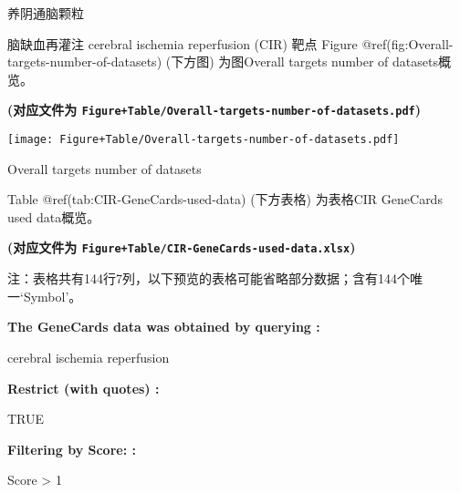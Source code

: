 \documentclass[
  ignorenonframetext,
]{beamer}
\begin{document}
\begin{frame}[fragile]{养阴通脑颗粒}
\begin{block}{脑缺血再灌注 cerebral ischemia reperfusion (CIR) 靶点}
Figure @ref(fig:Overall-targets-number-of-datasets) (下方图) 为图Overall
targets number of datasets概览。

\textbf{(对应文件为
\texttt{Figure+Table/Overall-targets-number-of-datasets.pdf})}

\def\@captype{figure}
\begin{center}
\texttt{[image: Figure+Table/Overall-targets-number-of-datasets.pdf]}
\caption{Overall targets number of datasets}\label{fig:Overall-targets-number-of-datasets}
\end{center}

Table @ref(tab:CIR-GeneCards-used-data) (下方表格) 为表格CIR GeneCards
used data概览。

\textbf{(对应文件为 \texttt{Figure+Table/CIR-GeneCards-used-data.xlsx})}

\begin{center}\begin{tcolorbox}[colback=gray!10, colframe=gray!50, width=0.9\linewidth, arc=1mm, boxrule=0.5pt]注：表格共有144行7列，以下预览的表格可能省略部分数据；含有144个唯一`Symbol'。
\end{tcolorbox}
\end{center}\begin{center}\begin{tcolorbox}[colback=gray!10, colframe=gray!50, width=0.9\linewidth, arc=1mm, boxrule=0.5pt]
\textbf{
The GeneCards data was obtained by querying
:}

\vspace{0.5em}

    cerebral ischemia reperfusion

\vspace{2em}


\textbf{
Restrict (with quotes)
:}

\vspace{0.5em}

    TRUE

\vspace{2em}


\textbf{
Filtering by Score:
:}

\vspace{0.5em}

    Score > 1

\vspace{2em}
\end{tcolorbox}
\end{center}


\end{block}
\end{frame}
\end{document}

